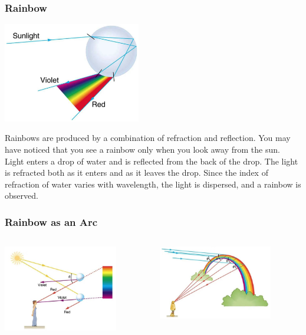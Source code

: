 \documentclass{beamer}
\begin{document}
\begin{frame}\frametitle{Rainbow}
\begin{center}
\includegraphics[width=6cm]{fig/rainbow2.jpg}
\end{center}
Rainbows are produced by a combination of refraction and reflection. You may have noticed that you see a rainbow only when you look away from the sun. Light enters a drop of water and is reflected from the back of the drop. The light is refracted both as it enters and as it leaves the drop. Since the index of refraction of water varies with wavelength, the light is dispersed, and a rainbow is observed.
\end{frame}

\begin{frame}\frametitle{Rainbow as an Arc}
\begin{columns}
\begin{column}{5.5cm}
\begin{center}
\includegraphics[width=5cm]{fig/rainbow3.jpg}
\end{center}
\end{column}
\begin{column}{5.5cm}
\begin{center}
\includegraphics[width=5cm]{fig/rainbow4.jpg}
\end{center}
\end{column}
\end{columns}
\end{frame}
\end{document}
